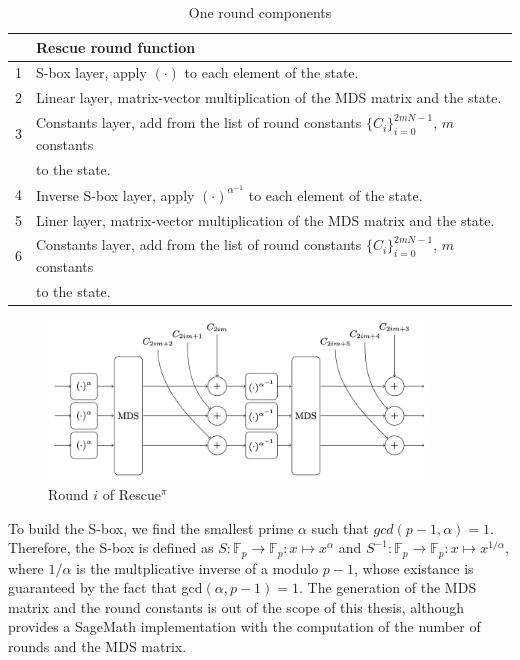\begin{table}[htbp]
    \centering
    \begin{tabular}{rl}
        \toprule
        & Rescue round function \\
        \midrule
        1 & S-box layer, apply $(\cdot)$ to each element of the state. \\
        2 & Linear layer, matrix-vector multiplication of the MDS matrix and the state. \\
        3 & Constants layer, add from the list of round constants $\{C_i\}_{i=0}^{2mN-1}$, $m$ constants \\
        & to the state. \\
        4 & Inverse S-box layer, apply $(\cdot)^{\alpha^{-1}}$ to each element of the state. \\
        5 & Liner layer, matrix-vector multiplication of the MDS matrix and the state. \\
        6 & Constants layer, add from the list of round constants $\{C_i\}_{i=0}^{2mN-1}$, $m$ constants \\
        & to the state. \\
    \end{tabular}
    \caption{One round components}
    \label{tab:rescue-sing-round}
\end{table}

\begin{figure}
    \centering
    \includegraphics[width=0.9\textwidth]{graphics/rescue_i_round.jpg}
    \caption{Round $i$ of Rescue$^\pi$~\cite{szepieniec2020rescue}}
    \label{fig:rescue-i-round}
\end{figure}

To build the S-box, we find the smallest prime $\alpha$ such that $gcd(p-1, \alpha) = 1$. Therefore, the S-box is defined as $S : \mathbb{F}_{p} \longrightarrow \mathbb{F}_{p} : x \mapsto x^\alpha$ and $S^{-1} : \mathbb{F}_{p} \longrightarrow \mathbb{F}_{p} : x \mapsto x^{1/\alpha}$, where $1/\alpha$ is the multplicative inverse of a modulo $p-1$, whose existance is guaranteed by the fact that gcd$(\alpha, p - 1) = 1$. The generation of the MDS matrix and the round constants is out of the scope of this thesis, although~\cite{szepieniec2020rescue} provides a SageMath implementation with the computation of the number of rounds and the MDS matrix.

